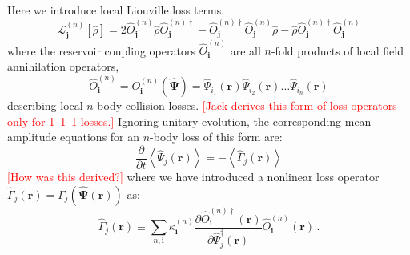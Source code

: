 \documentclass[aps,prl,twocolumn,showpacs,amsmath,amssymb,superscriptaddress]{revtex4-1}
\newcommand{\remark}[1]{\textcolor{red}{{[}#1{]}}}
\begin{document}
{Here we introduce local Liouville loss terms,
\begin{equation}
	\mathcal{L}_{\mathbf{j}}^{(n)} \left[ \hat{\rho}\right] =
	2 \hat{O}_{\mathbf{j}}^{(n)} \hat{\rho}\hat{O}_{\mathbf{j}}^{(n)\dagger} -
	\hat{O}_{\mathbf{j}}^{(n)\dagger}\hat{O}_{\mathbf{j}}^{(n)}\hat{\rho} -
	\hat{\rho}\hat{O}_{\mathbf{j}}^{(n)\dagger}\hat{O}_{\mathbf{j}}^{(n)}
\end{equation}
where the reservoir coupling operators $\hat{O}_{\mathbf{i}}^{(n)}$
are all $n$-fold products of local field annihilation operators,
\begin{equation}
	\hat{O}_{\mathbf{i}}^{(n)} =
	O_{\mathbf{i}}^{(n)} \left( \widehat{\boldsymbol{\Psi}} \right) =
	\widehat{\Psi}_{i_{1}} \left( \mathbf{r} \right)
	\widehat{\Psi}_{i_{2}} \left( \mathbf{r} \right) \ldots
	\widehat{\Psi}_{i_{n}} \left( \mathbf{r} \right)
\end{equation}
describing local $n$-body collision losses.
	\remark{Jack derives this form of loss operators only for 1--1--1 losses.}
Ignoring unitary evolution, the corresponding mean amplitude equations
for an $n$-body loss of this form are:
\begin{equation}
	\frac{\partial}{\partial t} \left\langle
		\widehat{\Psi}_{j} \left( \mathbf{r} \right)
	\right\rangle =
	-\left\langle \hat{\Gamma}_{j} \left( \mathbf{r} \right) \right\rangle
\end{equation}
	\remark{How was this derived?}
where we have introduced a nonlinear loss operator $\hat{\Gamma}_{j} \left( \mathbf{r} \right) =
\Gamma_{j} \left( \widehat{\boldsymbol{\Psi}} \left( \mathbf{r} \right) \right)$
as:
\begin{equation}
	\hat{\Gamma}_{j} \left( \mathbf{r} \right) \equiv
	\sum_{n,\mathbf{i}} \kappa_{\mathbf{i}}^{(n)}
	\frac{\partial\hat{O}_{\mathbf{i}}^{(n)\dagger}	\left( \mathbf{r} \right)}
		{\partial \hat{\Psi}_{j}^{\dagger} \left( \mathbf{r} \right)}
	\hat{O}_{\mathbf{i}}^{(n)} \left( \mathbf{r} \right) \,.
\end{equation}

}
\end{document}
